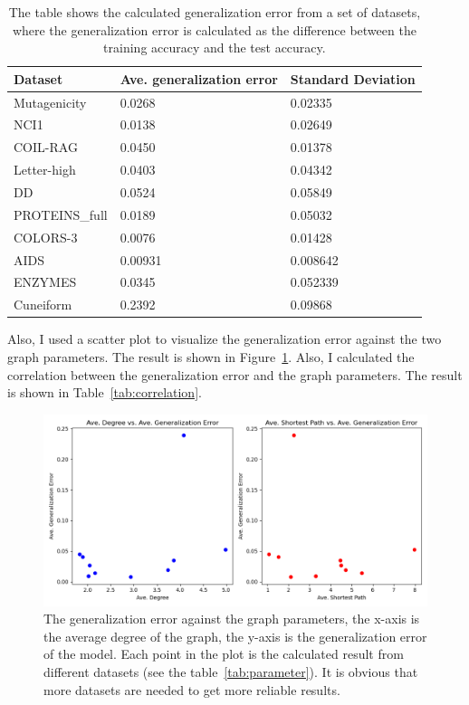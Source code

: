 \documentclass{article}
\begin{document}
\begin{table}[h!]
    \centering
    \begin{tabular}{@{}lll@{}}
    \toprule
    Dataset        & Ave. generalization error & Standard Deviation   \\ \midrule
    Mutagenicity   & 0.0268      & 0.02335 \\
    NCI1           & 0.0138      & 0.02649 \\
    COIL-RAG       & 0.0450      & 0.01378 \\
    Letter-high    & 0.0403      & 0.04342 \\
    DD             & 0.0524      & 0.05849 \\
    PROTEINS\_full & 0.0189      & 0.05032 \\
    COLORS-3       & 0.0076      & 0.01428 \\
    AIDS           &  0.00931    & 0.008642 \\
    ENZYMES           &  0.0345    & 0.052339 \\
    Cuneiform           &  0.2392    & 0.09868 \\ \bottomrule
    \end{tabular}
    \caption{The table shows the calculated generalization error from a set of datasets, where the generalization error is calculated as the difference between the training accuracy and the test accuracy.}
    \label{tab:error}
\end{table}

Also, I used a scatter plot to visualize the generalization error against the two graph parameters. The result is shown in Figure~\ref{fig:scatter}. Also, I calculated the correlation between the generalization error and the graph parameters. The result is shown in Table~\ref{tab:correlation}.

\begin{figure}[h!]
    \includegraphics[width=\textwidth]{final_results.png}
    \caption{The generalization error against the graph parameters, the x-axis is the average degree of the graph, the y-axis is the generalization error of the model. Each point in the plot is the calculated result from different datasets (see the table~\ref{tab:parameter}). It is obvious that more datasets are needed to get more reliable results.}
    \label{fig:scatter}
\end{figure}
\end{document}
